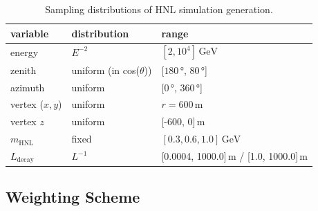 \begin{table}
    \centering
    \begin{tabular} { l || l | l}
        variable & distribution & range \\
        \hline \hline 
        energy & $E^{-2}$ & $[2, 10^4]\,\si{\GeV}$ \\
        zenith & uniform (in cos($\theta$)) & [$180\,\si{\degree}$, $80\,\si{\degree}$] \\
        azimuth & uniform & [$0\,\si{\degree}$, $360\,\si{\degree}$] \\
        vertex ($x,y$) & uniform & $r=600$\,\si{\m} \\
        vertex $z$ & uniform & [-600, 0]\,\si{\m} \\
        $m_\mathrm{HNL}$ & fixed & $[0.3, 0.6, 1.0]\,\si{\GeV}$ \\
        $L_\mathrm{decay}$ & $L^{-1}$ & [0.0004, 1000.0]\,\si{\m} / [1.0, 1000.0]\,\si{\m} \\
    \end{tabular}
    \caption{Sampling distributions of HNL simulation generation.}   
\end{table}


\subsection{Weighting Scheme}

